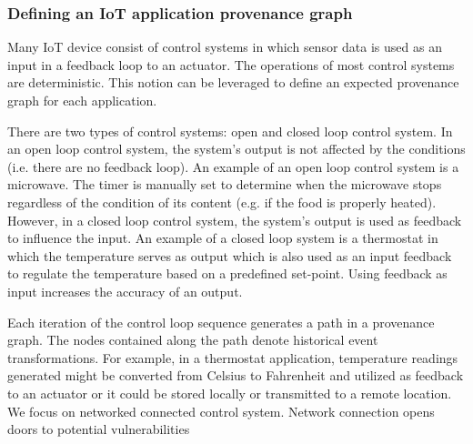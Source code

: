 \subsubsection{Defining an IoT application provenance graph}
Many IoT device consist of control systems in which sensor data is used as an input in a feedback loop to an actuator. The operations of most control systems are deterministic. This notion can be leveraged to define an expected provenance graph for each application. 


\par There are two types of control systems: open and closed loop control system. In an open loop control system, the system's output is not affected by the conditions (i.e. there are no feedback loop). An example of an open loop control system is a microwave. The timer is manually set to determine when the microwave stops regardless of the condition of its content (e.g. if the food is properly heated). However, in a closed loop control system, the system's output is used as feedback to influence the input.  An example of a closed loop system is a thermostat in which the temperature serves as output which is also used as an input feedback to regulate the temperature based on a predefined set-point. Using feedback as input increases the accuracy of an output. \par Each iteration of the control loop sequence generates a path in a provenance graph. The nodes contained along the path denote historical event transformations. For example, in a thermostat application, temperature readings generated might be converted from Celsius to Fahrenheit and utilized as feedback to an actuator or it could be stored locally or transmitted to a remote location. We focus on networked connected control system. Network connection opens doors to potential vulnerabilities





 




